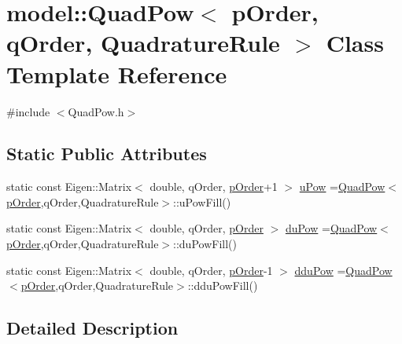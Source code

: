 \hypertarget{classmodel_1_1_quad_pow}{}\section{model\+:\+:Quad\+Pow$<$ p\+Order, q\+Order, Quadrature\+Rule $>$ Class Template Reference}
\label{classmodel_1_1_quad_pow}


{\ttfamily \#include $<$Quad\+Pow.\+h$>$}

\subsection*{Static Public Attributes}
\begin{DoxyCompactItemize}
\item 
static const Eigen\+::\+Matrix$<$ double, q\+Order, \hyperlink{_spline_enums_8h_aedcf2109f459315e1a7f2af73ec9b603af272f135877a9453abc217f6592feca7}{p\+Order}+1 $>$ \hyperlink{classmodel_1_1_quad_pow_a69933d30ada092da62f152abf4af1f67}{u\+Pow} =\hyperlink{classmodel_1_1_quad_pow}{Quad\+Pow}$<$\hyperlink{_spline_enums_8h_aedcf2109f459315e1a7f2af73ec9b603af272f135877a9453abc217f6592feca7}{p\+Order},q\+Order,Quadrature\+Rule$>$\+::u\+Pow\+Fill()
\item 
static const Eigen\+::\+Matrix$<$ double, q\+Order, \hyperlink{_spline_enums_8h_aedcf2109f459315e1a7f2af73ec9b603af272f135877a9453abc217f6592feca7}{p\+Order} $>$ \hyperlink{classmodel_1_1_quad_pow_abfee4edf14f4a62a1755222983506d70}{du\+Pow} =\hyperlink{classmodel_1_1_quad_pow}{Quad\+Pow}$<$\hyperlink{_spline_enums_8h_aedcf2109f459315e1a7f2af73ec9b603af272f135877a9453abc217f6592feca7}{p\+Order},q\+Order,Quadrature\+Rule$>$\+::du\+Pow\+Fill()
\item 
static const Eigen\+::\+Matrix$<$ double, q\+Order, \hyperlink{_spline_enums_8h_aedcf2109f459315e1a7f2af73ec9b603af272f135877a9453abc217f6592feca7}{p\+Order}-\/1 $>$ \hyperlink{classmodel_1_1_quad_pow_af1b239374b835bda2a643f97f03fab38}{ddu\+Pow} =\hyperlink{classmodel_1_1_quad_pow}{Quad\+Pow}$<$\hyperlink{_spline_enums_8h_aedcf2109f459315e1a7f2af73ec9b603af272f135877a9453abc217f6592feca7}{p\+Order},q\+Order,Quadrature\+Rule$>$\+::ddu\+Pow\+Fill()
\end{DoxyCompactItemize}


\subsection{Detailed Description}
